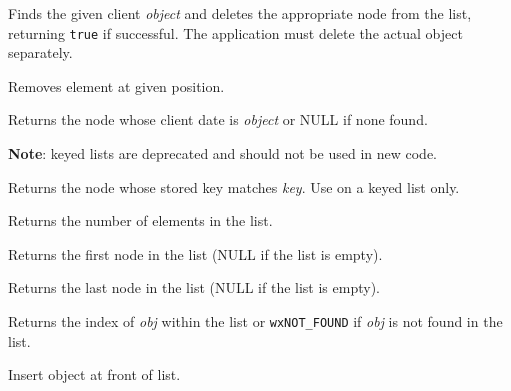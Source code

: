Finds the given client {\it object} and deletes the appropriate node from the list, returning
{\tt true} if successful. The application must delete the actual object separately.

\label{wxlisterase}


Removes element at given position.

\label{wxlistfind}


Returns the node whose client date is {\it object} or NULL if none found.

{\bf Note}: keyed lists are deprecated and should not be used in new code.



Returns the node whose stored key matches {\it key}. Use on a keyed list only.

\label{wxlistgetcount}


Returns the number of elements in the list.

\label{wxlistgetfirst}


Returns the first node in the list (NULL if the list is empty).

\label{wxlistgetlast}


Returns the last node in the list (NULL if the list is empty).

\label{wxlistindexof}


Returns the index of {\it obj} within the list or {\tt wxNOT\_FOUND} if {\it obj} 
is not found in the list.

\label{wxlistinsert}


Insert object at front of list.


